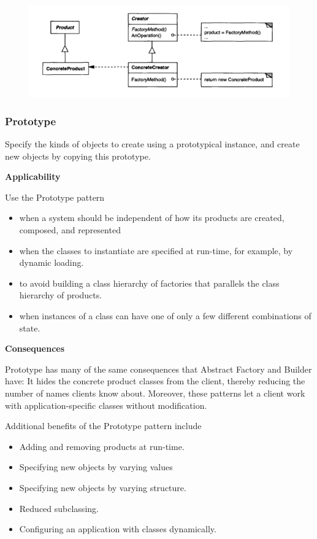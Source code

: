 \documentclass{article}
\begin{document}
\begin{figure}[h]
    \centering
    \includegraphics[width=14cm]{diagrams/pattern-3-factory-method.png}
\end{figure}

\newpage
\subsubsection{Prototype}
Specify the kinds of objects to create using a prototypical instance, and create new objects by copying this prototype.

\textbf{Applicability}

Use the Prototype pattern 
\begin{itemize}
    \item when a system should be independent of how its products are created, composed, and represented
    \item when the classes to instantiate are specified at run-time, for example, by dynamic loading.
    \item to avoid building a class hierarchy of factories that parallels the class hierarchy of products.
    \item when instances of a class can have one of only a few different combinations of state.
\end{itemize}

\textbf{Consequences}

Prototype has many of the same consequences that Abstract Factory and Builder have: It hides the concrete product classes from the client, thereby reducing the number of names clients know about. Moreover, these patterns let a client work with application-specific classes without modification.

Additional benefits of the Prototype pattern include
\begin{itemize}
    \item Adding and removing products at run-time.
    \item Specifying new objects by varying values
    \item Specifying new objects by varying structure.
    \item Reduced subclassing.
    \item Configuring an application with classes dynamically.
\end{itemize}
\end{document}
